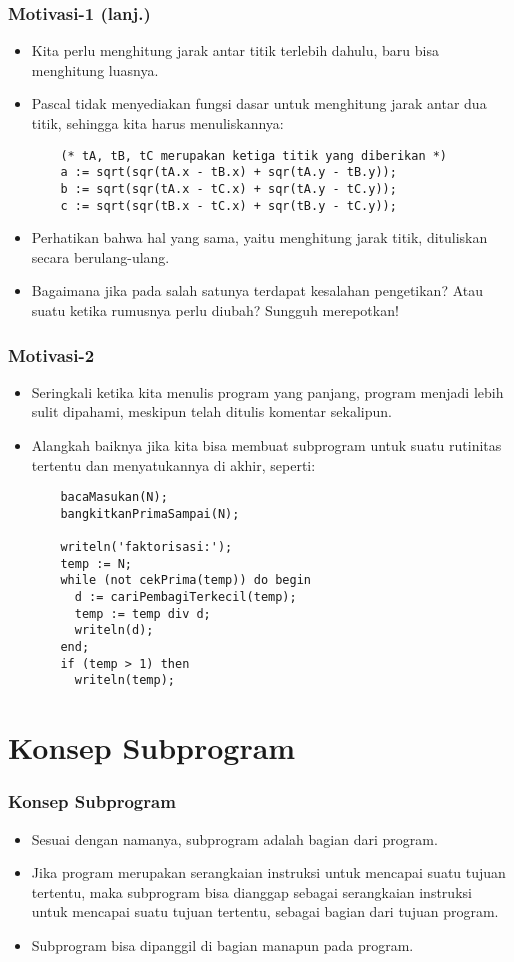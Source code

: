 \begin{frame}[fragile]
\frametitle{Motivasi-1 (lanj.)}
\begin{itemize}
  \item Kita perlu menghitung jarak antar titik terlebih dahulu, baru bisa menghitung luasnya.
  \item Pascal tidak menyediakan fungsi dasar untuk menghitung jarak antar dua titik, sehingga kita harus menuliskannya:
  \begin{lstlisting}
    (* tA, tB, tC merupakan ketiga titik yang diberikan *)
    a := sqrt(sqr(tA.x - tB.x) + sqr(tA.y - tB.y));
    b := sqrt(sqr(tA.x - tC.x) + sqr(tA.y - tC.y));
    c := sqrt(sqr(tB.x - tC.x) + sqr(tB.y - tC.y));
  \end{lstlisting}
  \item Perhatikan bahwa hal yang sama, yaitu menghitung jarak titik, dituliskan secara berulang-ulang.
  \item Bagaimana jika pada salah satunya terdapat kesalahan pengetikan? Atau suatu ketika rumusnya perlu diubah? Sungguh merepotkan!
\end{itemize}
\end{frame}

\begin{frame}[fragile]
\frametitle{Motivasi-2}
\begin{itemize}
  \item Seringkali ketika kita menulis program yang panjang, program menjadi lebih sulit dipahami, meskipun telah ditulis komentar sekalipun.
  \item Alangkah baiknya jika kita bisa membuat subprogram untuk suatu rutinitas tertentu dan menyatukannya di akhir, seperti:
  \begin{lstlisting}
    bacaMasukan(N);
    bangkitkanPrimaSampai(N);

    writeln('faktorisasi:');
    temp := N;
    while (not cekPrima(temp)) do begin
      d := cariPembagiTerkecil(temp);
      temp := temp div d;
      writeln(d);
    end;
    if (temp > 1) then
      writeln(temp);
  \end{lstlisting}
\end{itemize}
\end{frame}

\section{Konsep Subprogram}
\frame{\sectionpage}

\begin{frame}
\frametitle{Konsep Subprogram}
\begin{itemize}
  \item Sesuai dengan namanya, subprogram adalah bagian dari program.
  \item Jika program merupakan serangkaian instruksi untuk mencapai suatu tujuan tertentu, maka subprogram bisa dianggap sebagai serangkaian instruksi untuk mencapai suatu tujuan tertentu, \alert{sebagai bagian dari tujuan program}.
  \item Subprogram bisa dipanggil di bagian manapun pada program.
\end{itemize}
\end{frame}

